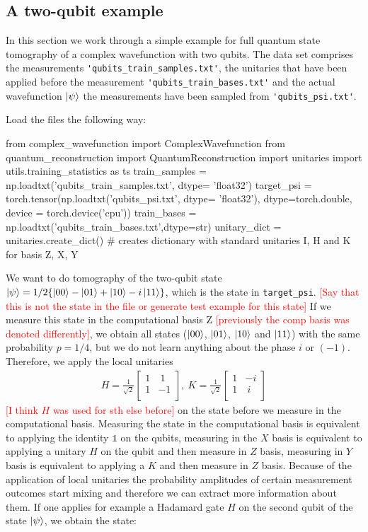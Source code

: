 \documentclass[submission, Phys]{SciPost}
\begin{document}
\subsection{A two-qubit example}

In this section we work through a simple example for full quantum state tomography of a complex wavefunction with two qubits. The data set comprises the measurements \verb|'qubits_train_samples.txt'|, the unitaries that have been applied before the measurement \verb|'qubits_train_bases.txt'| and the actual wavefunction $\ket{\psi}$ the measurements have been sampled from \verb|'qubits_psi.txt'|.

Load the files the following way:

\begin{python}
	from complex_wavefunction import ComplexWavefunction
	from quantum_reconstruction import QuantumReconstruction
	import unitaries
	import utils.training_statistics as ts
	train_samples = np.loadtxt('qubits_train_samples.txt', dtype= 'float32')
	target_psi = torch.tensor(np.loadtxt('qubits_psi.txt', dtype= 'float32'), dtype=torch.double, device = torch.device('cpu'))
	train_bases = np.loadtxt('qubits_train_bases.txt',dtype=str)
	unitary_dict = unitaries.create_dict() # creates dictionary with standard unitaries I, H and K for basis Z, X, Y
\end{python}


We want to do tomography of the two-qubit state
$\ket{\psi} = 1/2 \{ \ket{00} - \ket{01} + \ket{10} - i \ket{11} \}$,
which is the state in \verb|target_psi|. \textcolor{red}{[Say that this is not the state in the file or generate test example for this state]}
If we measure this state in the computational basis Z \textcolor{red}{[previously the comp basis was denoted differently]}, we obtain all states ($\ket{00}$, $\ket{01}$, $\ket{10}$ and $\ket{11}$) with the same probability $p = 1/4$, but we do not learn anything about the phase $i$ or $(-1)$.
Therefore, we apply the local unitaries
\begin{align}
	H = \frac{1}{\sqrt{2}}
	\begin{bmatrix}
		1 & ~1 \\
		1 & -1 \\
	\end{bmatrix},~
	K = \frac{1}{\sqrt{2}}
	\begin{bmatrix}
		1 & -i \\
		1 & ~i \\
	\end{bmatrix}
\end{align}
%
\textcolor{red}{[I think $H$ was used for sth else before]}
on the state before we measure in the computational basis. Measuring the state in the computational basis is equivalent to applying the identity $\mathds{1}$ on the qubits, measuring in the $X$ basis is equivalent to applying a unitary $H$ on the qubit and then measure in $Z$ basis, measuring in $Y$ basis is equivalent to applying a $K$ and then measure in $Z$ basis. Because of the application of local unitaries the probability amplitudes of certain measurement outcomes start mixing and therefore we can extract more information about them. If one applies for example a Hadamard gate $H$ on the second qubit of the state $\ket{\psi}$, we obtain the state:
\end{document}
